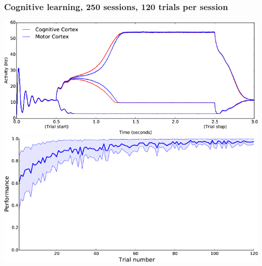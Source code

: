 \documentclass[11pt]{article}
\begin{document}
\subsubsection{Cognitive learning, 250 sessions, 120 trials per session}
\includegraphics[scale=.6]{figure-1.png}
\includegraphics[scale=.5]{figure-2.png}
\end{document}
